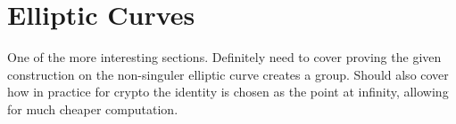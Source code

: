 \section{Elliptic Curves}

One of the more interesting sections. Definitely need to
cover proving the given construction on the non-singuler elliptic
curve creates a group. Should also cover how in practice for crypto
the identity is chosen as the point at infinity, allowing for 
much cheaper computation.
